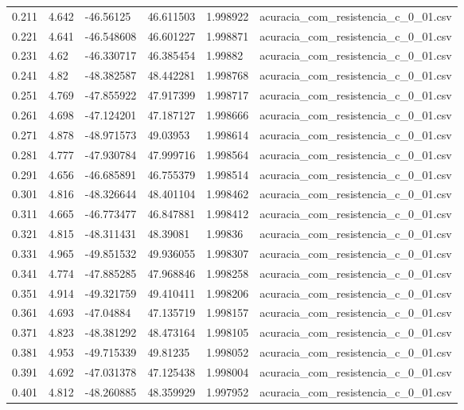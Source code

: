 \begin{table}
\begin{tabular}{llllll}
0.211 & 4.642 & -46.56125 & 46.611503 & 1.998922 & acuracia\_com\_resistencia\_c\_0\_01.csv \\
0.221 & 4.641 & -46.548608 & 46.601227 & 1.998871 & acuracia\_com\_resistencia\_c\_0\_01.csv \\
0.231 & 4.62 & -46.330717 & 46.385454 & 1.99882 & acuracia\_com\_resistencia\_c\_0\_01.csv \\
0.241 & 4.82 & -48.382587 & 48.442281 & 1.998768 & acuracia\_com\_resistencia\_c\_0\_01.csv \\
0.251 & 4.769 & -47.855922 & 47.917399 & 1.998717 & acuracia\_com\_resistencia\_c\_0\_01.csv \\
0.261 & 4.698 & -47.124201 & 47.187127 & 1.998666 & acuracia\_com\_resistencia\_c\_0\_01.csv \\
0.271 & 4.878 & -48.971573 & 49.03953 & 1.998614 & acuracia\_com\_resistencia\_c\_0\_01.csv \\
0.281 & 4.777 & -47.930784 & 47.999716 & 1.998564 & acuracia\_com\_resistencia\_c\_0\_01.csv \\
0.291 & 4.656 & -46.685891 & 46.755379 & 1.998514 & acuracia\_com\_resistencia\_c\_0\_01.csv \\
0.301 & 4.816 & -48.326644 & 48.401104 & 1.998462 & acuracia\_com\_resistencia\_c\_0\_01.csv \\
0.311 & 4.665 & -46.773477 & 46.847881 & 1.998412 & acuracia\_com\_resistencia\_c\_0\_01.csv \\
0.321 & 4.815 & -48.311431 & 48.39081 & 1.99836 & acuracia\_com\_resistencia\_c\_0\_01.csv \\
0.331 & 4.965 & -49.851532 & 49.936055 & 1.998307 & acuracia\_com\_resistencia\_c\_0\_01.csv \\
0.341 & 4.774 & -47.885285 & 47.968846 & 1.998258 & acuracia\_com\_resistencia\_c\_0\_01.csv \\
0.351 & 4.914 & -49.321759 & 49.410411 & 1.998206 & acuracia\_com\_resistencia\_c\_0\_01.csv \\
0.361 & 4.693 & -47.04884 & 47.135719 & 1.998157 & acuracia\_com\_resistencia\_c\_0\_01.csv \\
0.371 & 4.823 & -48.381292 & 48.473164 & 1.998105 & acuracia\_com\_resistencia\_c\_0\_01.csv \\
0.381 & 4.953 & -49.715339 & 49.81235 & 1.998052 & acuracia\_com\_resistencia\_c\_0\_01.csv \\
0.391 & 4.692 & -47.031378 & 47.125438 & 1.998004 & acuracia\_com\_resistencia\_c\_0\_01.csv \\
0.401 & 4.812 & -48.260885 & 48.359929 & 1.997952 & acuracia\_com\_resistencia\_c\_0\_01.csv \\

\end{tabular}
\end{table}
